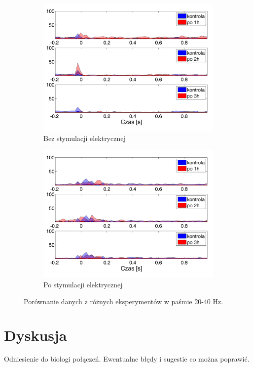 \documentclass{pracamgr_2}
\begin{document}
\begin{figure}[h]
	\begin{subfigure}{.5\textwidth}
		\centering
		\includegraphics[width=1.\linewidth]{kontrola15_20-40_z_SC2_do_CxC10.png}
		\caption{Bez stymulacji elektrycznej}
		\label{rys:kon_SC_CxC}
	\end{subfigure}%
	\begin{subfigure}{.5\textwidth}
		\centering
		\includegraphics[width=1.\linewidth]{beta3_20-40_z_SC2_do_CxC8.png}
		\caption{Po stymulacji elektrycznej}
		\label{rys:beta_SC_CxC}
	\end{subfigure}
	\caption{Porównanie danych z różnych eksperymentów w paśmie 20-40 Hz.}
	\label{rys:20_40_SC_CxC}
\end{figure}

\chapter{Dyskusja}
Odniesienie do biologi połączeń.
Ewentualne błędy i sugestie co można poprawić.



\end{document}
